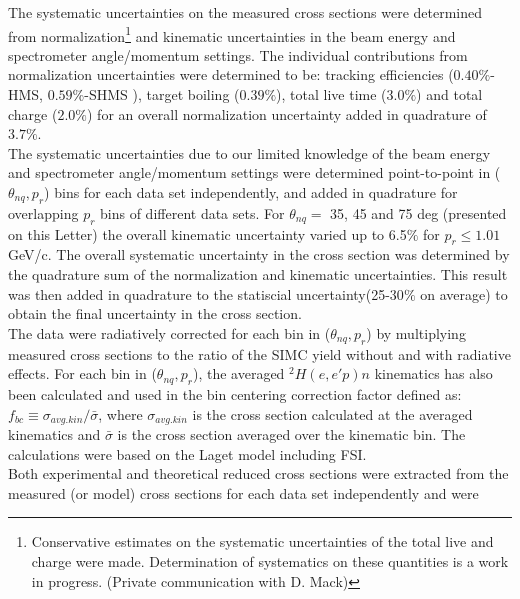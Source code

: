\indent The systematic uncertainties on the measured cross sections were determined from normalization\footnote{Conservative estimates on the systematic uncertainties of the total live and charge were made.
Determination of systematics on these quantities is a work in progress. (Private communication with D. Mack)} and kinematic uncertainties in the beam energy and spectrometer angle/momentum settings. The individual
contributions from normalization uncertainties were determined to be: tracking efficiencies ($0.40 \%$-HMS, $0.59 \%$-SHMS ), target boiling ($0.39 \%$), total live time ($3.0 \%$) and total charge ($2.0\%$)
for an overall normalization uncertainty added in quadrature of $3.7 \%$. \\
\indent The systematic uncertainties due to our limited knowledge of the beam energy and spectrometer angle/momentum settings were determined point-to-point in ($\theta_{nq}, p_{r}$) bins for each data set independently, and added in quadrature for overlapping $p_{r}$ bins
of different data sets. For $\theta_{nq}=$ 35, 45 and 75 deg (presented on this Letter) the overall kinematic uncertainty varied up to 6.5$\%$ for $p_{r}\leq1.01$ GeV/c.
The overall systematic uncertainty in the cross section was determined by the quadrature sum of the normalization and kinematic uncertainties. This result was then added in quadrature
to the statiscial uncertainty(25-30$\%$ on average) to obtain the final uncertainty in the cross section. \\
\indent The data were radiatively corrected for each bin in ($\theta_{nq}, p_{r}$) by multiplying measured cross sections to the ratio of the SIMC yield without and with radiative effects.
For each bin in ($\theta_{nq}, p_{r}$), the averaged $^{2}H(e,e'p)n$ kinematics has also been calculated and used in the bin centering correction factor defined as:
$f_{bc} \equiv \sigma_{avg.kin} / \bar{\sigma}$, where $\sigma_{avg.kin}$ is the cross section calculated at the averaged kinematics and $\bar{\sigma}$ is the cross
section averaged over the kinematic bin. The calculations were based on the Laget model including FSI\cite{LAGET2005, PhysRevC.21.861}.\\
\indent Both experimental and theoretical reduced cross sections were extracted from the measured (or model) cross sections for each data set independently and were 
\onecolumngrid
